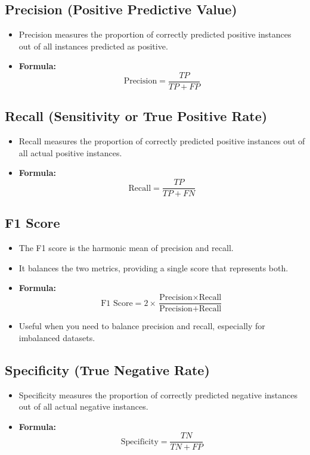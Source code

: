 \documentclass[8pt]{article}
\begin{document}
\subsection*{Precision (Positive Predictive Value)}
\begin{itemize}
    \item Precision measures the proportion of correctly predicted positive instances out of all instances predicted as positive.
    \item \textbf{Formula:}
    \[
    \text{Precision} = \frac{TP}{TP + FP}
    \]
\end{itemize}

\subsection*{Recall (Sensitivity or True Positive Rate)}
\begin{itemize}
    \item Recall measures the proportion of correctly predicted positive instances out of all actual positive instances.
    \item \textbf{Formula:}
    \[
    \text{Recall} = \frac{TP}{TP + FN}
    \]
\end{itemize}

\subsection*{F1 Score}
\begin{itemize}
    \item The F1 score is the harmonic mean of precision and recall.
    \item It balances the two metrics, providing a single score that represents both.
    \item \textbf{Formula:}
    \[
    \text{F1 Score} = 2 \times \frac{\text{Precision} \times \text{Recall}}{\text{Precision} + \text{Recall}}
    \]
    \item Useful when you need to balance precision and recall, especially for imbalanced datasets.
\end{itemize}

\subsection*{Specificity (True Negative Rate)}
\begin{itemize}
    \item Specificity measures the proportion of correctly predicted negative instances out of all actual negative instances.
    \item \textbf{Formula:}
    \[
    \text{Specificity} = \frac{TN}{TN + FP}
    \]
\end{itemize}
\end{document}
